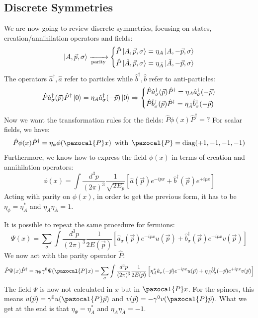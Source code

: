 \documentclass[../main.tex]{subfiles}
\begin{document}
\subsection{Discrete Symmetries}
We are now going to review discrete symmetries, focusing on states, creation/annihilation  operators and fields:
\[
\ket{A,\Vec{p},\sigma}\xrightarrow[\text{parity}]{}\left\{
\begin{aligned}
&\hat{P}\ket{A,\Vec{p},\sigma}=\eta_A\ket{A,-\Vec{p},\sigma}\\
&\hat{P}\ket{\bar{A},\Vec{p},\sigma}=\eta_{\bar{A}}\ket{\bar{A},-\Vec{p},\sigma}
\end{aligned}
\right.
\]
The operators $\hat{a}^\dagger, \hat{a}$ refer to particles while $\hat{b}^\dagger, \hat{b}$ refer to anti-particles:
\[
\hat{P}\hat{a}^\dagger_\sigma(\Vec{p})\hat{P}^\dagger\ket{0}=\eta_A\hat{a}^\dagger_\sigma(-\Vec{p})\ket{0}\Rightarrow\left\{
\begin{aligned}
&\hat{P}\hat{a}^\dagger_\sigma(\Vec{p})\hat{P}^\dagger=\eta_A\hat{a}^\dagger_\sigma(-\Vec{p})\\
&\hat{P}\hat{b}^\dagger_\sigma(\Vec{p})\hat{P}^\dagger=\eta_{\bar{A}}\hat{b}^\dagger_\sigma(-\Vec{p})
\end{aligned}
\right.
\]
Now we want the transformation rules for the fields: $\hat{P}\phi(x)\hat{P}^\dagger=?$ For scalar fields, we have:
\[
\hat{P}\phi(x)\hat{P}^\dagger=\eta_\phi\phi(\pazocal{P}x) \, \text{ with } \, \pazocal{P}=\text{diag}(+1,-1,-1,-1)
\]
Furthermore, we know how to express the field $\phi(x)$ in terms of creation and annihilation operators:
\[
\phi(x)=\int \frac{d^3p}{(2\pi)^3}\frac{1}{\sqrt{2E_p}}\left[\hat{a}(\Vec{p})e^{-ipx}+\hat{b}^\dagger(\Vec{p})e^{+ipx}\right]
\]
Acting with parity on $\phi(x)$, in order to get the previous form, it has to be $\eta_\phi=\eta_A^*$ and $\eta_A\eta_{\bar{A}}=1$.

It is possible to repeat the same procedure for fermions:
\[
\Psi(x)=\sum_\sigma\int \frac{d^3p}{(2\pi)^3}\frac{1}{2E(\Vec{p})}\left[\hat{a}_\sigma(\Vec{p})e^{-ipx}u(\Vec{p})+\hat{b}^\dagger_\sigma(\Vec{p})e^{+ipx}v(\Vec{p})\right]
\]
We now act with the parity operator $\hat{P}$:
\[
\hat{P}\Psi(x)\hat{P}^\dagger=\eta_\Psi\gamma^0\Psi(\pazocal{P}x)=\sum_\sigma\int \frac{d^3p}{(2\pi)^3}\frac{1}{2E(\Vec{p})}\left[\eta_A^*\hat{a}_\sigma(-\Vec{p})e^{-ipx}u(\Vec{p})+\eta_{\bar{A}}\hat{b}^\dagger_\sigma(-\Vec{p})e^{+ipx}v(\Vec{p})\right]
\]
The field $\Psi$ is now not calculated in $x$ but in $\pazocal{P}x$. For the spinors, this means $u(\Vec{p})=\gamma^0u(\pazocal{P}\Vec{p})$ and $v(\Vec{p})=-\gamma^0v(\pazocal{P}\Vec{p})$. What we get at the end is that $\eta_\Psi=\eta_A^*$ and $\eta_A\eta_{\bar{A}}=-1$.
\end{document}
